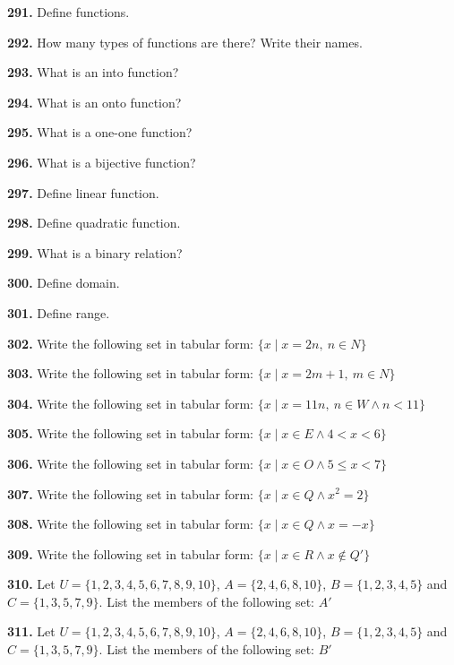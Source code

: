 \documentclass[11pt]{article}
\begin{document}
\bigskip
\noindent\textbf{291.} Define functions.

\bigskip
\noindent\textbf{292.} How many types of functions are there? Write their names.

\bigskip
\noindent\textbf{293.} What is an into function?

\bigskip
\noindent\textbf{294.} What is an onto function?

\bigskip
\noindent\textbf{295.} What is a one-one function?

\bigskip
\noindent\textbf{296.} What is a bijective function?

\bigskip
\noindent\textbf{297.} Define linear function.

\bigskip
\noindent\textbf{298.} Define quadratic function.

\bigskip
\noindent\textbf{299.} What is a binary relation?

\bigskip
\noindent\textbf{300.} Define domain.

\bigskip
\noindent\textbf{301.} Define range.

\bigskip
\noindent\textbf{302.} Write the following set in tabular form: $\{x \mid x=2n,\ n\in N\}$

\bigskip
\noindent\textbf{303.} Write the following set in tabular form: $\{x \mid x=2m+1,\ m\in N\}$

\bigskip
\noindent\textbf{304.} Write the following set in tabular form: $\{x \mid x=11n,\ n\in W \wedge n<11\}$

\bigskip
\noindent\textbf{305.} Write the following set in tabular form: $\{x \mid x\in E \wedge 4<x<6\}$

\bigskip
\noindent\textbf{306.} Write the following set in tabular form: $\{x \mid x\in O \wedge 5\le x<7\}$

\bigskip
\noindent\textbf{307.} Write the following set in tabular form: $\{x \mid x\in Q \wedge x^2=2\}$

\bigskip
\noindent\textbf{308.} Write the following set in tabular form: $\{x \mid x\in Q \wedge x=-x\}$

\bigskip
\noindent\textbf{309.} Write the following set in tabular form: $\{x \mid x\in R \wedge x\notin Q'\}$

\bigskip
\noindent\textbf{310.} Let $U=\{1,2,3,4,5,6,7,8,9,10\}$, $A=\{2,4,6,8,10\}$, $B=\{1,2,3,4,5\}$ and $C=\{1,3,5,7,9\}$. List the members of the following set: $A'$

\bigskip
\noindent\textbf{311.} Let $U=\{1,2,3,4,5,6,7,8,9,10\}$, $A=\{2,4,6,8,10\}$, $B=\{1,2,3,4,5\}$ and $C=\{1,3,5,7,9\}$. List the members of the following set: $B'$
\end{document}
